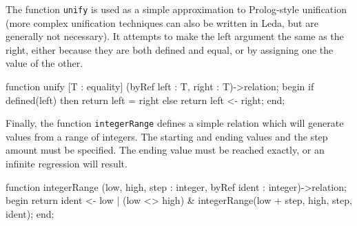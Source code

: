 The function {\tt unify} is used as a simple approximation to
Prolog-style unification (more complex unification techniques
can also be written in Leda, but are generally not necessary).
It attempts to make the left argument the same as the right,
either because they are both defined and equal, or by assigning
one the value of the other.

\begin{cprog}

function unify [T : equality] (byRef left : T, right : T)->relation;
begin
	if defined(left) then
		return left = right
	else
		return left <- right;
end;

\end{cprog}

Finally, the function {\tt integerRange} defines a simple
relation which will generate values from a range of integers.
The starting and ending values and the step amount must be specified.
The ending value must be reached exactly, or an infinite regression will
result.

\begin{cprog}

function integerRange
	(low, high, step : integer, byRef ident : integer)->relation;
begin
	return ident <- low
		| (low <> high) & integerRange(low + step, high, step, ident);
end;

\end{cprog}
